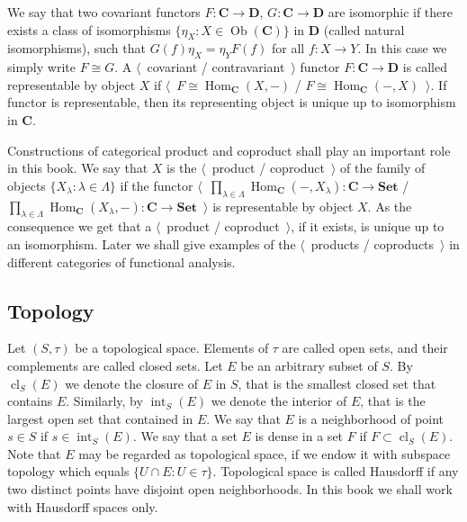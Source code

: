 We say that two covariant functors $F:\mathbf{C}\to\mathbf{D}$,
$G:\mathbf{C}\to\mathbf{D}$ are isomorphic if there exists a class of
isomorphisms $ \{\eta_X:X\in\operatorname{Ob}(\mathbf{C}) \}$ in $\mathbf{D}$
(called natural isomorphisms), such that $G(f)\eta_X=\eta_Y F(f)$ for all
$f:X\to Y$. In this case we simply write $F\cong G$. A $\langle$~covariant /
contravariant~$\rangle$ functor $F:\mathbf{C}\to\mathbf{D}$ is called
representable by object $X$ if
$\langle$~$F\cong\operatorname{Hom}_{\mathbf{C}}(X,-)$ /
$F\cong\operatorname{Hom}_{\mathbf{C}}(-,X)$~$\rangle$. If functor is
representable, then its representing object is unique up to isomorphism in
$\mathbf{C}$.

Constructions of categorical product and coproduct shall play an important role
in this book. We say that $X$ is the $\langle$~product / coproduct~$\rangle$
of the family of objects $ \{X_\lambda:\lambda\in\Lambda \}$ if the functor
$\langle$~$
\prod_{\lambda\in\Lambda}\operatorname{Hom}_{\mathbf{C}}(-,X_{\lambda})
:\mathbf{C}\to\mathbf{Set}$
/
$
\prod_{\lambda\in\Lambda}\operatorname{Hom}_{\mathbf{C}}(X_{\lambda},-)
:\mathbf{C}\to\mathbf{Set}$~$\rangle$
is representable by object $X$. As the consequence we get that a
$\langle$~product / coproduct~$\rangle$, if it exists, is unique up to an
isomorphism. Later we shall give examples of the $\langle$~products /
coproducts~$\rangle$ in different categories of functional analysis. 



\subsection{
  Topology}\label{SubSectionTopology}

Let $(S,\tau)$ be a topological space. Elements of $\tau$ are called open sets,
and their complements are called closed sets. Let $E$ be an arbitrary subset of
$S$. By $\operatorname{cl}_S(E)$ we denote the closure of $E$ in $S$, that is
the smallest closed set that contains $E$. Similarly, by
$\operatorname{int}_S(E)$ we denote the interior of $E$, that is the largest
open set that contained in $E$. We say that $E$ is a neighborhood of point 
$s\in S$ if $s\in \operatorname{int}_S(E)$. We say that a set $E$ is dense 
in a set $F$ if $F\subset\operatorname{cl}_S(E)$. Note that $E$ may be regarded
as topological space, if we endow it with subspace topology which equals $
\{U\cap E:U\in\tau \}$. Topological space is called Hausdorff if any two
distinct points have disjoint open neighborhoods. In this book we shall work
with Hausdorff spaces only.

